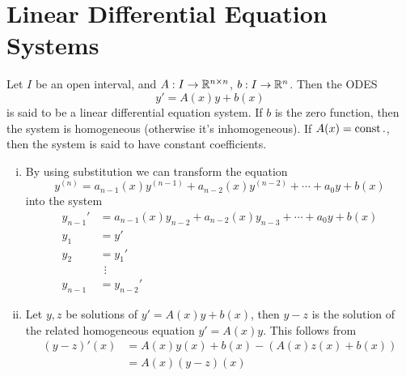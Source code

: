 \documentclass[../../script.tex]{subfiles}
\begin{document}
\section{Linear Differential Equation Systems}

\begin{defi}
    Let $I$ be an open interval, and $A: I \rightarrow \mathbb{R}^{n \times n}$, $b: I \rightarrow \mathbb{R}^n$.
    Then the ODES 
    \[
        y' = A(x)y + b(x)
    \]
    is said to be a linear differential equation system. If $b$ is the zero function, then the system is homogeneous (otherwise it's inhomogeneous).
    If $A(x) = \operatorname{const}.$, then the system is said to have constant coefficients.
\end{defi}

\begin{rem}
    \begin{enumerate}[(i)]
        \item By using substitution we can transform the equation 
        \[
            y^{(n)} = a_{n-1}(x) y^{(n-1)} + a_{n-2}(x) y^{(n-2)} + \cdots + a_0 y + b(x)
        \]
        into the system 
        \begin{align*}
            y_{n-1}' &= a_{n-1}(x) y_{n-2} + a_{n-2}(x) y_{n-3} + \cdots + a_0 y + b(x) \\
            y_1 &= y' \\
            y_2 &= y_1' \\
            &~~\vdots \\
            y_{n-1} &= y_{n-2}'
        \end{align*}

        \item Let $y, z$ be solutions of $y' = A(x) y + b(x)$, then $y - z$ is the solution of the related homogeneous equation $y' = A(x)y$.
        This follows from 
        \begin{align*}
            (y - z)'(x) &= A(x)y(x) + b(x) - (A(x)z(x) + b(x)) \\
            &= A(x) (y - z)(x)
        \end{align*}
    \end{enumerate}
\end{rem}
\end{document}
